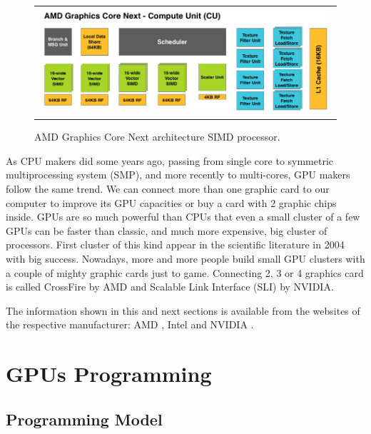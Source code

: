 \documentclass[review]{elsarticle}
\begin{document}
\begin{figure}[!ht]
\centering
\begin{tabular}{c}
\includegraphics[width=0.99\textwidth]{amd-gcn-cu.png} \\
\end{tabular}
\caption{AMD Graphics Core Next architecture SIMD processor.}
\label{fig:tahitib}
\end{figure}

As CPU makers did some years ago, passing from single core to symmetric multiprocessing system (SMP), and more recently to multi-cores, GPU makers follow the same trend. We can connect more than one graphic card to our computer to improve its GPU capacities or buy a card with 2 graphic chips inside. GPUs are so much powerful than CPUs that even a small cluster of a few GPUs can be faster than classic, and much more expensive, big cluster of processors. First cluster of this kind appear in the scientific literature in 2004 \cite{10.1109/SC.2004.26} with big success. Nowadays, more and more people build small GPU clusters with a couple of mighty graphic cards just to game. Connecting 2, 3 or 4 graphics card is called CrossFire by AMD and Scalable Link Interface (SLI) by NVIDIA.

The information shown in this and next sections is available from the websites of the respective manufacturer: AMD \cite{amd}, Intel \cite{intel} and NVIDIA \cite{nvidia}.

\section{GPUs Programming}
\label{sec:programming}

\subsection{Programming Model}
\end{document}
